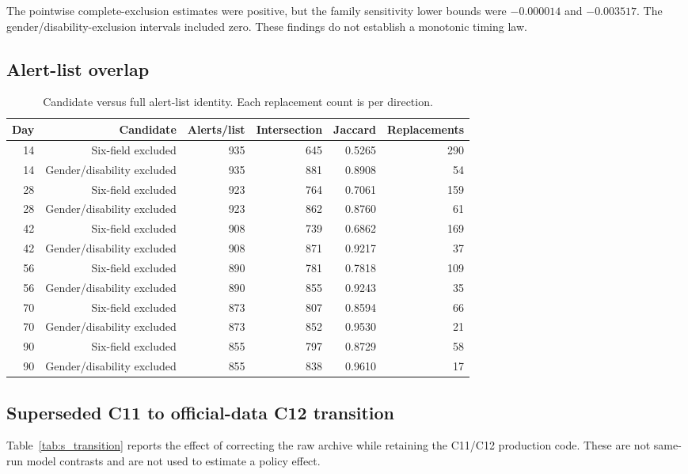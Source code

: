 \documentclass[education,supfile,submit,moreauthors]{Definitions/mdpi}
\begin{document}
The pointwise complete-exclusion estimates were positive, but the family sensitivity lower bounds were $-0.000014$ and $-0.003517$. The gender/disability-exclusion intervals included zero. These findings do not establish a monotonic timing law.

\subsection{Alert-list overlap}

\begin{table}[H]
\centering
\caption{Candidate versus full alert-list identity. Each replacement count is per direction.}
\label{tab:s_overlap}
\scriptsize
\begin{tabular}{rrrrrr}
\toprule
Day & Candidate & Alerts/list & Intersection & Jaccard & Replacements \\
\midrule
14 & Six-field excluded & 935 & 645 & 0.5265 & 290 \\
14 & Gender/disability excluded & 935 & 881 & 0.8908 & 54 \\
28 & Six-field excluded & 923 & 764 & 0.7061 & 159 \\
28 & Gender/disability excluded & 923 & 862 & 0.8760 & 61 \\
42 & Six-field excluded & 908 & 739 & 0.6862 & 169 \\
42 & Gender/disability excluded & 908 & 871 & 0.9217 & 37 \\
56 & Six-field excluded & 890 & 781 & 0.7818 & 109 \\
56 & Gender/disability excluded & 890 & 855 & 0.9243 & 35 \\
70 & Six-field excluded & 873 & 807 & 0.8594 & 66 \\
70 & Gender/disability excluded & 873 & 852 & 0.9530 & 21 \\
90 & Six-field excluded & 855 & 797 & 0.8729 & 58 \\
90 & Gender/disability excluded & 855 & 838 & 0.9610 & 17 \\
\bottomrule
\end{tabular}
\end{table}
\FloatBarrier

\subsection{Superseded C11 to official-data C12 transition}

Table~\ref{tab:s_transition} reports the effect of correcting the raw archive while retaining the C11/C12 production code. These are not same-run model contrasts and are not used to estimate a policy effect.
\end{document}
